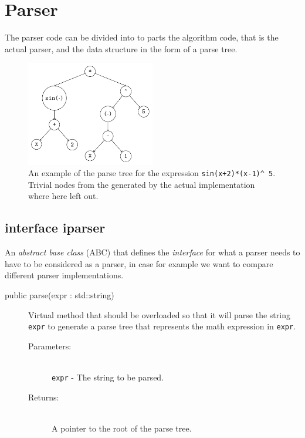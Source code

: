 \documentclass[a4paper,11pt]{kth-mag}
\begin{document}
\section{Parser}
The parser code can be divided into to parts the algorithm code, that is the 
actual parser, and the data structure in the form of a parse tree. 

\begin{figure}[ht]
\begin{center}
    \includegraphics[width=0.5\textwidth]{parse-tree.pdf}
    \caption{\small{
        An example of the parse tree for the
        expression \texttt{sin(x+2)*(x-1)}\texttt{\^~}\!\!\texttt{5}.
        Trivial nodes from the generated by the actual implementation where
        here left out.
    }}
   \label{fig:parsetree}
\end{center}
\end{figure}

\subsection{interface iparser}
An \emph{abstract base class} (ABC) that defines the \emph{interface} for what a parser 
needs to have to be considered as a parser, in case for example
we want to compare different parser implementations.
\begin{description}
    \item[public parse(expr : std::string)] Virtual method that should be
    overloaded so that it will parse the string \texttt{expr} to
    generate a parse tree that represents the math expression in \texttt{expr}.
    \begin{description}
        \item[Parameters:]~\\
            \verb+expr+ - The string to be parsed.
        \item[Returns:]~\\
            A pointer to the root of the parse tree.
    \end{description}
\end{description}
\end{document}
